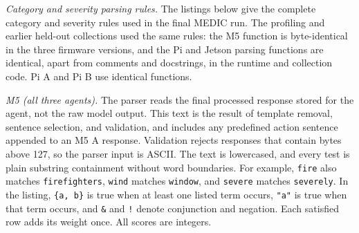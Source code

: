 \textit{Category and severity parsing rules.}
The listings below give the complete category and severity rules used in the final MEDIC run. The profiling and earlier held-out collections used the same rules: the M5 function is byte-identical in the three firmware versions, and the Pi and Jetson parsing functions are identical, apart from comments and docstrings, in the runtime and collection code. Pi A and Pi B use identical functions.

\textit{M5 (all three agents).}
The parser reads the final processed response stored for the agent, not the raw model output. This text is the result of template removal, sentence selection, and validation, and includes any predefined action sentence appended to an M5 A response. Validation rejects responses that contain bytes above 127, so the parser input is ASCII. The text is lowercased, and every test is plain substring containment without word boundaries. For example, \texttt{fire} also matches \texttt{firefighters}, \texttt{wind} matches \texttt{window}, and \texttt{severe} matches \texttt{severely}. In the listing, \texttt{\{a, b\}} is true when at least one listed term occurs, \texttt{"a"} is true when that term occurs, and \texttt{\&} and \texttt{!} denote conjunction and negation. Each satisfied row adds its weight once. All scores are integers.

